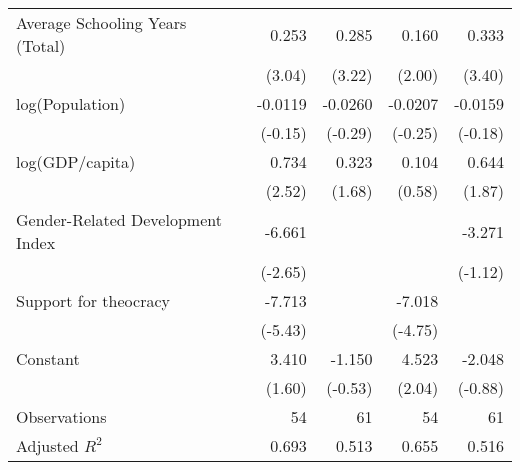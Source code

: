 {\begin{table}[htp]
{\begin{tabular}{@{}l*{4}{D{.}{.}{7}}@{}}
			Average Schooling Years (Total)&       0.253\sym{**} &       0.285\sym{**} &       0.160         &       0.333\sym{**} \\
			                    &      (3.04)         &      (3.22)         &      (2.00)         &      (3.40)         \\
			[1em]
			log(Population)     &     -0.0119         &     -0.0260         &     -0.0207         &     -0.0159         \\
			                    &     (-0.15)         &     (-0.29)         &     (-0.25)         &     (-0.18)         \\
			[1em]
			log(GDP/capita)     &       0.734\sym{*}  &       0.323         &       0.104         &       0.644         \\
			                    &      (2.52)         &      (1.68)         &      (0.58)         &      (1.87)         \\
			[1em]
			Gender-Related Development Index&      -6.661\sym{*}  &                     &                     &      -3.271         \\
			                    &     (-2.65)         &                     &                     &     (-1.12)         \\
			[1em]
			Support for theocracy&      -7.713\sym{***}&                     &      -7.018\sym{***}&                     \\
			                    &     (-5.43)         &                     &     (-4.75)         &                     \\
			[1em]
			Constant            &       3.410         &      -1.150         &       4.523\sym{*}  &      -2.048         \\
			                    &      (1.60)         &     (-0.53)         &      (2.04)         &     (-0.88)         \\
			\hline
			Observations        &          54         &          61         &          54         &          61         \\
			Adjusted \(R^{2}\)  &       0.693         &       0.513         &       0.655         &       0.516         \\


\end{tabular}}
\end{table}}
